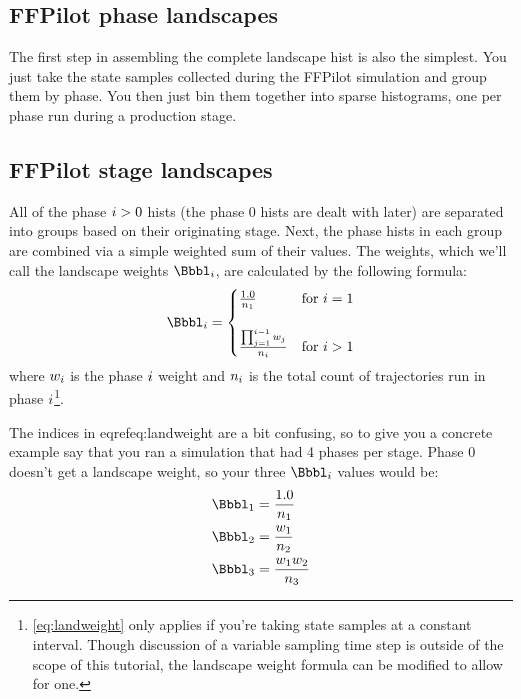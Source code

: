 \subsection{FFPilot phase landscapes}\label{sec:landscape_phase}
The first step in assembling the complete landscape hist is also the simplest. You just take the state samples collected during the FFPilot simulation and group them by phase. You then just bin them together into sparse histograms, one per phase run during a production stage.

\subsection{FFPilot stage landscapes}\label{sec:landscape_stage}
All of the phase $i>0$ hists (the phase 0 hists are dealt with later) are separated into groups based on their originating stage. Next, the phase hists in each group are combined via a simple weighted sum of their values. The weights, which we'll call the landscape weights $\landweight$, are calculated by the following formula:
\begin{equation}
\label{eq:landweight}
    \landweight =
    \begin{cases}
        \frac{1.0}{n_1} & \text{for}\ \ix=1 \\
        \\
        \frac{ \prod_{\jx=1}^{\ix - 1} w_{\jx}}{n_{\ix}} & \text{for}\ \ix>1
    \end{cases}
\end{equation}
where $w_{i}$ is the phase $i$ weight and $n_{i}$ is the total count of trajectories run in phase $i$\footnote{\eqref{eq:landweight} only applies if you're taking state samples at a constant interval. Though discussion of a variable sampling time step is outside of the scope of this tutorial, the landscape weight formula can be modified\cite{Valeriani:2007hv} to allow for one.}.

The indices in eqref{eq:landweight} are a bit confusing, so to give you a concrete example say that you ran a simulation that had 4 phases per stage. Phase 0 doesn't get a landscape weight, so your three $\landweight$ values would be:
\begin{align*}
    \landweightx{1} &= \frac{1.0}{n_1}\\
    \landweightx{2} &= \frac{w_1}{n_2}\\
    \landweightx{3} &= \frac{w_1 w_2}{n_3}\\
\end{align*}

